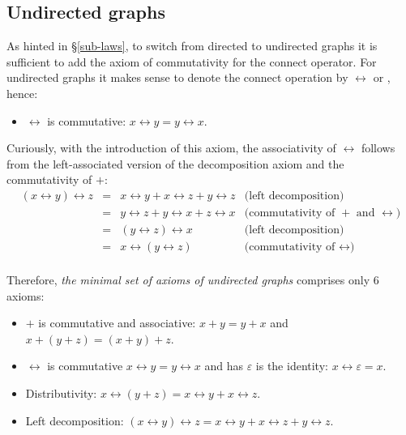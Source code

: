 \subsection{Undirected graphs}\label{sub-undirected}

As hinted in \S\ref{sub-laws}, to switch from directed to undirected graphs it
is sufficient to add the axiom of commutativity for the connect operator. For
undirected graphs it makes sense to denote the connect operation by $\leftrightarrow$ or
\textemdash, hence:

\begin{itemize}
    \item $\leftrightarrow$ is commutative: $x \leftrightarrow y = y \leftrightarrow x$.
\end{itemize}

Curiously, with the introduction of this axiom, the associativity of $\leftrightarrow$
follows from the left-associated version of the decomposition axiom and the
commutativity of $+$:
\[
\begin{array}{rcll}
(x \leftrightarrow y) \leftrightarrow z & = & x \leftrightarrow y + x \leftrightarrow z + y \leftrightarrow z & \text{(left decomposition)}\\
 & = & y \leftrightarrow z + y \leftrightarrow x + z \leftrightarrow x & \text{(commutativity of $+$ and $\leftrightarrow$)}\\
 & = &  (y \leftrightarrow z) \leftrightarrow x & \text{(left decomposition)}\\
 & = &   x \leftrightarrow (y \leftrightarrow z) & \text{(commutativity of $\leftrightarrow$)}\\
\end{array}
\]

Therefore, \emph{the minimal set of axioms of undirected graphs} comprises only 6 axioms:

\begin{itemize}
    \item $+$ is commutative and associative: $x + y = y + x$ and
    $x + (y + z) = (x + y) + z$.
    \item $\leftrightarrow$ is commutative $x \leftrightarrow y = y \leftrightarrow x$ and
    has $\varepsilon$ is the identity: $x \leftrightarrow \varepsilon = x$.
    \item Distributivity:
    $x \leftrightarrow (y + z) = x \leftrightarrow y + x \leftrightarrow z$.
    \item Left decomposition: $(x \leftrightarrow y) \leftrightarrow z =
    x \leftrightarrow y + x \leftrightarrow z + y \leftrightarrow z$.
\end{itemize}

